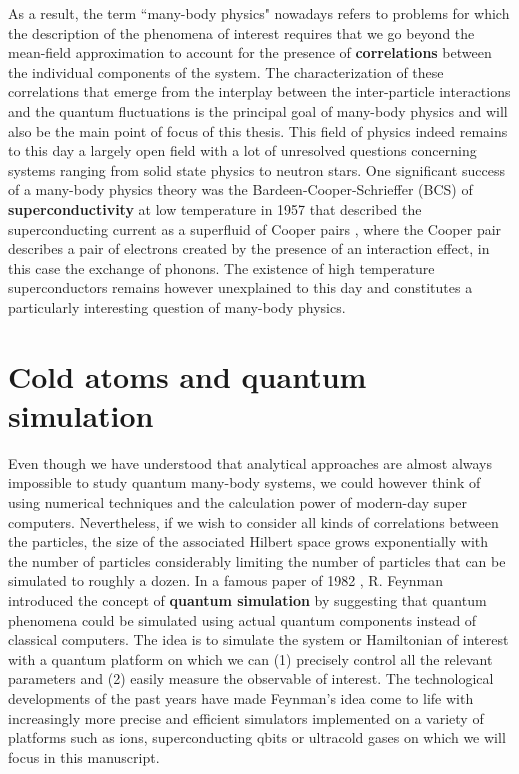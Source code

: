 As a result, the term ``many-body physics" nowadays refers to problems for which the description of the phenomena of interest requires that we go beyond the mean-field approximation to account for the presence of \textbf{correlations} between the individual components of the system. The characterization of these correlations that emerge from the interplay between the inter-particle interactions and the quantum fluctuations is the principal goal of many-body physics and will also be the main point of focus of this thesis. This field of physics indeed remains to this day a largely open field with a lot of unresolved questions concerning systems ranging from solid state physics to neutron stars. One significant success of a many-body physics theory was the Bardeen-Cooper-Schrieffer \cite{bardeen1957theory} (BCS) of \textbf{superconductivity} at low temperature in 1957 that described the superconducting current as a superfluid of Cooper pairs \cite{cooper1956bound}, where the Cooper pair describes a pair of electrons created by the presence of an interaction effect, in this case the exchange of phonons. The existence of high temperature superconductors remains however unexplained to this day and constitutes a particularly interesting question of many-body physics.

\section*{Cold atoms and quantum simulation}

Even though we have understood that analytical approaches are almost always impossible to study quantum many-body systems, we could however think of using numerical techniques and the calculation power of modern-day super computers. Nevertheless, if we wish to consider all kinds of correlations between the particles, the size of the associated Hilbert space grows exponentially with the number of particles considerably limiting the number of particles that can be simulated to roughly a dozen. In a famous paper of 1982 \cite{Feynman1982Simulating}, R. Feynman introduced the concept of \textbf{quantum simulation} by suggesting that quantum phenomena could be simulated using actual quantum components instead of classical computers. The idea is to simulate the system or Hamiltonian of interest with a quantum platform on which we can (1) precisely control all the relevant parameters and (2) easily measure the observable of interest. The technological developments of the past years have made Feynman's idea come to life with increasingly more precise and efficient simulators implemented on a variety of platforms such as ions, superconducting qbits or ultracold gases on which we will focus in this manuscript. 

